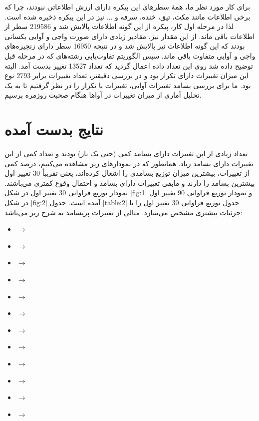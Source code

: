 \documentclass[12pt,onecolumn,a4paper]{article}
\begin{document}
    \par
    برای کار مورد نظر ما، همهٔ سطرهای این پیکره دارای ارزش اطلاعاتی نبودند، چرا که برخی اطلاعات مانند مکث، تپق، خنده، سرفه و ... نیز در این پیکره ذخیره شده است. لذا در مرحله اول کار، پیکره از این گونه اطلاعات پالایش شد و 219586 سطر از اطلاعات باقی ماند. از این مقدار نیز، مقادیر زیادی دارای صورت واجی و آوایی یکسانی بودند که این گونه اطلاعات نیز پالایش شد و در نتیجه 16950 سطر دارای زنجیره‌های واجی و آوایی متفاوت باقی ماند. سپس الگوریتم تفاوت‌یابی رشته‌های که در مرحله قبل توضیح داده شد روی این تعداد داده اعمال گردید که تعداد 13527 تغییر بدست آمد. البته این میزان تغییرات دارای تکرار بود و در بررسی دقیقتر، تعداد تغییرات برابر 2793 نوع بود. ما برای بررسی بسامد تغییرات آوایی، تغییرات با تکرار را در نظر گرفتیم تا به یک تحلیل آماری از میزان تغییرات در آواها هنگام صحبت روزمره برسیم.

    \section{نتایج بدست آمده}
    تعداد زیادی از این تغییرات دارای بسامد کمی (حتی یک بار) بودند و تعداد کمی از این تغییرات دارای بسامد زیاد. همانطور که در نمودارهای زیر مشاهده می‌کنیم، درصد کمی از تغییرات، بیشترین میزان توزیع بسامدی را اشغال کرده‌اند، یعنی تقریباً 30 تغییر اول بیشترین بسامد را دارند و مابقی تغییرات دارای بسامد و احتمال وقوع کمتری می‌باشند. نمودار توزیع فراوانی 30 تغییر اول در شکل \ref{fig:1} و نمودار توزیع فراوانی 90 تغییر اول در شکل \ref{fig:2} آمده است. جدول \ref{table:2} جدول توزیع فراوانی 30 تغییر اول را با جزئیات بیشتری مشخص می‌سازد. مثالی از تغییرات پربسامد به شرح زیر می‌باشد:

    \begin{LTR}
        \begin{itemize}
            \item {} $\rightarrow$ 
            \item {} $\rightarrow$ 
            \item {} $\rightarrow$ 
            \item {} $\rightarrow$ 
            \item {} $\rightarrow$ 
            \item {} $\rightarrow$ 
            \item {} $\rightarrow$ 
            \item {} $\rightarrow$ 
            \item {} $\rightarrow$ 
            \item {} $\rightarrow$ 
            \item {} $\rightarrow$ 
            \item {} $\rightarrow$ 
        \end{itemize}
    \end{LTR}
\end{document}

